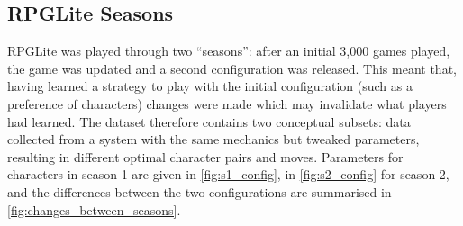 \subsection{RPGLite Seasons}
\label{seasons_of_rpglite}
\label{rpglite_configurations}

RPGLite was played through two ``seasons'': after an initial 3,000 games
played, the game was updated and a second configuration was released. This meant
that, having learned a strategy to play with the initial configuration (such as
a preference of characters) changes were made which may invalidate what players
had learned. The dataset therefore contains two conceptual subsets: data
collected from a system with the same mechanics but tweaked parameters,
resulting in different optimal character pairs and moves. Parameters for
characters in season 1 are given in \cref{fig:s1_config}, in
\cref{fig:s2_config} for season 2, and the differences between the two
configurations are summarised in \cref{fig:changes_between_seasons}.

